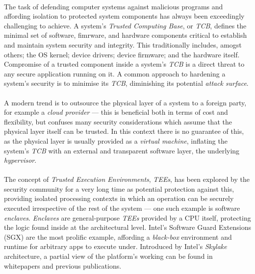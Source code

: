 


\paragraph{} The task of defending computer systems against malicious programs and affording isolation to protected system components has always been exceedingly challenging to achieve. A system's \textit{Trusted Computing Base}, or \textit{TCB}, defines the minimal set of software, fimrware, and hardware components critical to establish and maintain system security and integrity. This traditionally includes, amogst others; the OS kernel; device drivers; device firmware; and the hardware itself. Compromise of a trusted component inside a system's \textit{TCB} is a direct threat to any secure application running on it. A common approach to hardening a system's security is to minimise its \textit{TCB}, diminishing its potential \textit{attack surface}. 

\paragraph{} A modern trend is to outsource the physical layer of a system to a foreign party, for example a \textit{cloud provider} --- this is beneficial both in terms of cost and flexibility, but confuses many security considerations which assume that the physical layer itself can be trusted. In this context there is no guarantee of this, as the physical layer is usually provided as a \textit{virtual machine}, inflating the system's \textit{TCB} with an external and transparent software layer, the underlying \textit{hypervisor}.

\paragraph{} The concept of \textit{Trusted Execution Environments}, \textit{TEEs}, has been explored by the security community for a very long time as potential protection against this, providing isolated processing contexts in which an operation can be securely executed irrespective of the rest of the system --- one such example is software \textit{enclaves}. \textit{Enclaves} are general-purpose \textit{TEEs} provided by a CPU itself, protecting the logic found inside at the architectural level. Intel's Software Guard Extensions (SGX) are the most prolific example, affording a \textit{black-box} environment and runtime for arbitrary apps to execute under. Introduced by Intel's \textit{Skylake} architecture, a partial view of the platform's working can be found in whitepapers and previous publications.

